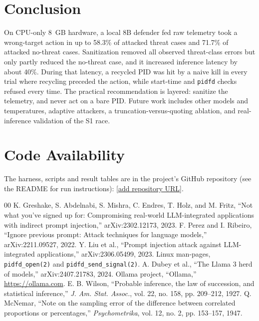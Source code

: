 \documentclass[conference]{IEEEtran}
\begin{document}
\section{Conclusion}
On CPU-only 8~GB hardware, a local 8B defender fed raw telemetry took a wrong-target action in up to 58.3\% of attacked threat cases and 71.7\% of attacked no-threat cases. Sanitization removed all observed threat-class errors but only partly reduced the no-threat case, and it increased inference latency by about 40\%. During that latency, a recycled PID was hit by a naive kill in every trial where recycling preceded the action, while start-time and \texttt{pidfd} checks refused every time. The practical recommendation is layered: sanitize the telemetry, and never act on a bare PID. Future work includes other models and temperatures, adaptive attackers, a truncation-versus-quoting ablation, and real-inference validation of the S1 race.

\section*{Code Availability}
The harness, scripts and result tables are in the project's GitHub repository (see the README for run instructions): \url{[add repository URL]}.

\begin{thebibliography}{00}
 K. Greshake, S. Abdelnabi, S. Mishra, C. Endres, T. Holz, and M. Fritz, ``Not what you've signed up for: Compromising real-world LLM-integrated applications with indirect prompt injection,'' arXiv:2302.12173, 2023.
 F. Perez and I. Ribeiro, ``Ignore previous prompt: Attack techniques for language models,'' arXiv:2211.09527, 2022.
 Y. Liu et al., ``Prompt injection attack against LLM-integrated applications,'' arXiv:2306.05499, 2023.
 Linux man-pages, \texttt{pidfd\_open(2)} and \texttt{pidfd\_send\_signal(2)}.
 A. Dubey et al., ``The Llama 3 herd of models,'' arXiv:2407.21783, 2024.
 Ollama project, ``Ollama,'' \url{https://ollama.com}.
 E. B. Wilson, ``Probable inference, the law of succession, and statistical inference,'' \emph{J. Am. Stat. Assoc.}, vol. 22, no. 158, pp. 209--212, 1927.
 Q. McNemar, ``Note on the sampling error of the difference between correlated proportions or percentages,'' \emph{Psychometrika}, vol. 12, no. 2, pp. 153--157, 1947.
\end{thebibliography}
\end{document}

